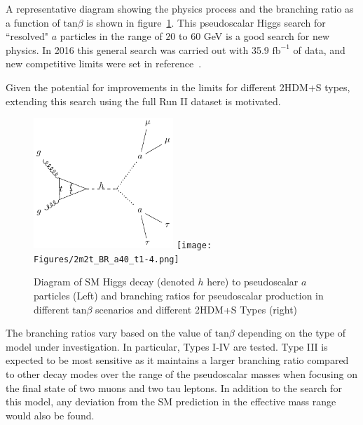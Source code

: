 A representative diagram showing the physics process and the branching ratio as a function of $\text{tan}\beta$ is shown in figure~\ref{fig:feynman_haa}. This pseudoscalar Higgs search for ``resolved" $a$ particles in the range of $20$ to $60$ GeV is a good search for new physics.
In 2016 this general search was carried out with 35.9 $\text{fb}^{-1}$ of data, and new competitive limits were set in reference~\cite{CMS-HIG-17-029}.

Given the potential for improvements in the limits for different 2HDM+S types, extending this search using the full Run II dataset is motivated. 


\begin{figure}[ht!b]
  \includegraphics[width=0.47\textwidth]{figures/feynman_haa.pdf}
  \texttt{[image: Figures/2m2t\_BR\_a40\_t1-4.png]}\\
    \caption{\label{fig:feynman_haa} Diagram of SM Higgs decay (denoted $h$ here) to pseudoscalar $a$ particles (Left) and branching ratios for pseudoscalar production in different $\text{tan}\beta$ scenarios and different 2HDM+S Types (right)}
\end{figure}

The branching ratios vary based on the value of $\text{tan}\beta$ depending on the type of model under investigation. In particular, Types I-IV are tested. Type III is expected to be most sensitive as it maintains a larger branching ratio compared to other decay modes over the range of the pseudoscalar masses when focusing on the final state of two muons and two tau leptons. In addition to the search for this model, any deviation from the SM prediction in the effective mass range would also be found.

